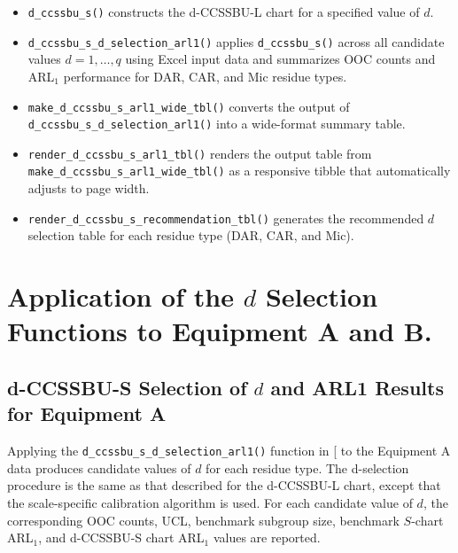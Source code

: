 \documentclass[
  12pt,
  letterpaper,
  DIV=11,
  numbers=noendperiod]{scrartcl}
\begin{document}
\begin{itemize}
\item
  \texttt{d\_ccssbu\_s()} constructs the d-CCSSBU-L chart for a
  specified value of \(d\).
\item
  \texttt{d\_ccssbu\_s\_d\_selection\_arl1()} applies
  \texttt{d\_ccssbu\_s()} across all candidate values \(d=1,\ldots,q\)
  using Excel input data and summarizes OOC counts and ARL\(_1\)
  performance for DAR, CAR, and Mic residue types.
\item
  \texttt{make\_d\_ccssbu\_s\_arl1\_wide\_tbl()} converts the output of
  \texttt{d\_ccssbu\_s\_d\_selection\_arl1()} into a wide-format summary
  table.
\item
  \texttt{render\_d\_ccssbu\_s\_arl1\_tbl()} renders the output table
  from \texttt{make\_d\_ccssbu\_s\_arl1\_wide\_tbl()} as a responsive
  tibble that automatically adjusts to page width.
\item
  \texttt{render\_d\_ccssbu\_s\_recommendation\_tbl()} generates the
  recommended \(d\) selection table for each residue type (DAR, CAR, and
  Mic).
\end{itemize}

\section{\texorpdfstring{Application of the \(d\) Selection Functions to
Equipment A and
B.}{Application of the d Selection Functions to Equipment A and B.}}\label{application-of-the-d-selection-functions-to-equipment-a-and-b.}

\subsection{\texorpdfstring{d-CCSSBU-S Selection of \(d\) and ARL1
Results for Equipment
A}{d-CCSSBU-S Selection of d and ARL1 Results for Equipment A}}\label{d-ccssbu-s-selection-of-d-and-arl1-results-for-equipment-a}

Applying the \texttt{d\_ccssbu\_s\_d\_selection\_arl1()} function in
{[}\citeproc{ref-Yang2026dccssbu}{1}{]} to the Equipment A data produces
candidate values of \(d\) for each residue type. The d-selection
procedure is the same as that described for the d-CCSSBU-L chart, except
that the scale-specific calibration algorithm is used. For each
candidate value of \(d\), the corresponding OOC counts, UCL, benchmark
subgroup size, benchmark \(S\)-chart ARL\(_1\), and d-CCSSBU-S chart
ARL\(_1\) values are reported.
\end{document}
